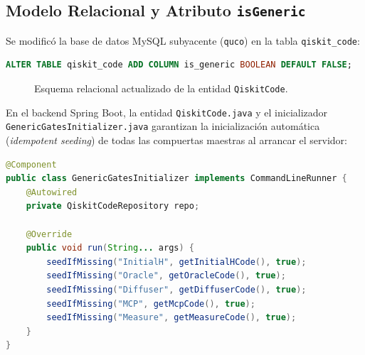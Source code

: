 \documentclass[11pt,a4paper]{article}
\begin{document}
\subsection{Modelo Relacional y Atributo \texttt{isGeneric}}
Se modificó la base de datos MySQL subyacente (\texttt{quco}) en la tabla \texttt{qiskit\_code}:
\begin{lstlisting}[language=SQL, caption={Migracion de la tabla qiskit\_code}]
ALTER TABLE qiskit_code ADD COLUMN is_generic BOOLEAN DEFAULT FALSE;
\end{lstlisting}

\begin{figure}[H]
\centering
{}
\caption{Esquema relacional actualizado de la entidad \texttt{QiskitCode}.}
\label{fig:db_schema}
\end{figure}

En el backend Spring Boot, la entidad \texttt{QiskitCode.java} y el inicializador \texttt{GenericGatesInitializer.java} garantizan la inicialización automática (\textit{idempotent seeding}) de todas las compuertas maestras al arrancar el servidor:
\begin{lstlisting}[language=Java, caption={Servicio de Inicializacion Idempotente GenericGatesInitializer}]
@Component
public class GenericGatesInitializer implements CommandLineRunner {
    @Autowired
    private QiskitCodeRepository repo;

    @Override
    public void run(String... args) {
        seedIfMissing("InitialH", getInitialHCode(), true);
        seedIfMissing("Oracle", getOracleCode(), true);
        seedIfMissing("Diffuser", getDiffuserCode(), true);
        seedIfMissing("MCP", getMcpCode(), true);
        seedIfMissing("Measure", getMeasureCode(), true);
    }
}
\end{lstlisting}
\end{document}
